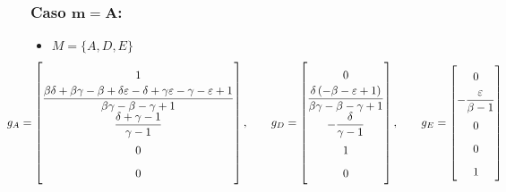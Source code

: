 \subsubsection*{Caso $\boldsymbol{m = A}$:}
\begin{itemize}
    \item $M = \{A,D,E\}$
    \[\hspace*{-4em}\renewcommand*{\arraystretch}{1.7}\everymath{\displaystyle} g_A = \left[\begin{matrix}1\\\frac{\beta \delta + \beta \gamma - \beta + \delta \varepsilon - \delta + \gamma \varepsilon - \gamma - \varepsilon + 1}{\beta \gamma - \beta - \gamma + 1}\\\frac{\delta + \gamma - 1}{\gamma - 1}\\0\\0\end{matrix}\right], \hspace*{2em}
    g_D = \left[\begin{matrix}0\\\frac{\delta \left(- \beta - \varepsilon + 1\right)}{\beta \gamma - \beta - \gamma + 1}\\- \frac{\delta}{\gamma - 1}\\1\\0\end{matrix}\right], \hspace*{2em}
    g_E = \left[\begin{matrix}0\\- \frac{\varepsilon}{\beta - 1}\\0\\0\\1\end{matrix}\right] \]


\end{itemize}

